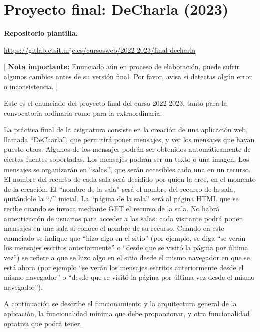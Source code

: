 \section{Proyecto final: DeCharla (2023)}
\label{practica-final-2023-05}

\textbf{Repositorio plantilla.}

\url{https://gitlab.etsit.urjc.es/cursosweb/2022-2023/final-decharla}

[ \textbf{Nota importante:} Enunciado aún en proceso de elaboración, puede sufrir algunos cambios antes de su versión final. Por favor, avisa si detectas algún error o inconsistencia. ]


Este es el enunciado del proyecto final del curso 2022-2023, tanto para la convocatoria ordinaria como para la extraordinaria.

La práctica final de la asignatura consiste en la creación de una aplicación web, llamada ``DeCharla'', que permitirá poner mensajes, y ver los mensajes que hayan puesto otros. Algunos de los mensajes podrán ser obtenidos automáticamente de ciertas fuentes soportadas. Los mensajes podrán ser un texto o una imagen. Los mensajes se organizarán en ``salas'', que serán accesibles cada una en un recurso. El nombre del recurso de cada sala será decidido por quien la cree, en el momento de la creación. El ``nombre de la sala'' será el nombre del recurso de la sala, quitándole la ``/'' inicial. La ``página de la sala'' será al página HTML que se recibe cuando se invoca mediante GET el recurso de la sala. No habrá autenticación de usuarios para acceder a las salas: cada visitante podrá poner mensajes en una sala si conoce el nombre de su recurso. Cuando en este enunciado se indique que ``hizo algo en el sitio'' (por ejemplo, se diga ``se verán los mensajes escritos anteriormente'' o ``desde que se visitó la página por última vez'') se refiere a que se hizo algo en el sitio desde el mismo navegador en que se está ahora (por ejemplo ``se verán los mensajes escritos anteriormente desde el mismo navegador'' o ``desde que se visitó la página por última vez desde el mismo navegador'').

A continuación se describe el funcionamiento y la arquitectura general de la aplicación, la funcionalidad mínima que debe proporcionar, y otra funcionalidad optativa que podrá tener.

